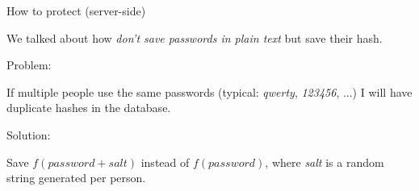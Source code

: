 \documentclass[handout, xcolor=dvipsnames,aspectratio=169]{beamer}
\begin{document}
\begin{frame}{How to protect (server-side)}
  

  \medskip

  \pause
  
  We talked about how \textit{don't save passwords in plain text} but save their hash.

  \medskip
  \pause

  Problem: 
  
  If multiple people use the same passwords (typical: \textit {qwerty}, \textit {123456}, ...) I will have duplicate hashes in the database.

  \medskip
  \pause
  Solution: 
  
  Save $f(password + salt)$ instead of $f(password)$, where \textit{salt} is a random string generated per person.
  
\end{frame}
\end{document}

